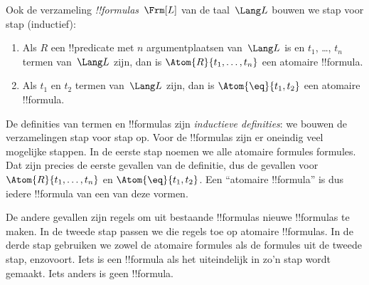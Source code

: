 \documentclass[../../../include/open-logic-section]{subfiles}
\begin{document}
\begin{defn}[Formules]
Ook de verzameling \emph{!!{formula}s}~$\Frm[L]$ van de taal~$\Lang L$
bouwen we stap voor stap (inductief):
\begin{enumerate}


\item Als $R$ een !!{predicate} met $n$ argumentplaatsen van~$\Lang L$
  is en $t_1$, \dots, $t_n$ termen van~$\Lang L$ zijn, dan is
  $\Atom{R}{t_1,\ldots, t_n}$ een atomaire !!{formula}.

\item Als $t_1$ en $t_2$ termen van~$\Lang L$ zijn, dan is
  $\Atom{\eq}{t_1, t_2}$ een atomaire !!{formula}.








\end{enumerate}
\end{defn}

\begin{explain}
De definities van termen en !!{formula}s zijn \emph{inductieve
definities}: we bouwen de verzamelingen stap voor stap op. Voor de
!!{formula}s zijn er oneindig veel mogelijke stappen. In de eerste
stap noemen we alle atomaire formules formules. Dat zijn precies de
eerste gevallen van de definitie, dus de gevallen voor
%
%
$\Atom{R}{t_1,\dots,t_n}$ en $\Atom{\eq}{t_1,t_2}$. Een ``atomaire
!!{formula}'' is dus iedere !!{formula} van een van deze vormen.

De andere gevallen zijn regels om uit bestaande !!{formula}s nieuwe
!!{formula}s te maken. In de tweede stap passen we die regels toe op
atomaire !!{formula}s. In de derde stap gebruiken we zowel de atomaire
formules als de formules uit de tweede stap, enzovoort. Iets is een
!!{formula} als het uiteindelijk in zo'n stap wordt gemaakt. Iets
anders is geen !!{formula}.
\end{explain}
\end{document}
